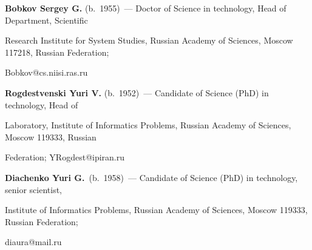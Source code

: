 \noindent

\textbf{Bobkov Sergey G.} (b.\ 1955)~--- Doctor of Science in technology, Head of Department, Scientific

Research Institute for System Studies, Russian Academy of Sciences, Moscow 117218, Russian Federation;

Bobkov@cs.niisi.ras.ru



\vspace*{2pt}



\noindent

\textbf{Rogdestvenski Yuri V.} (b.\ 1952)~--- Candidate of Science (PhD) in technology, Head of

Laboratory, Institute of Informatics Problems, Russian Academy of Sciences, Moscow 119333, Russian

Federation; YRogdest@ipiran.ru





\vspace*{2pt}



\noindent

\textbf{Diachenko Yuri G.}\ (b.\ 1958)~--- Candidate of Science (PhD) in technology, senior scientist,

Institute of Informatics Problems, Russian Academy of Sciences, Moscow 119333, Russian Federation;

diaura@mail.ru





\label{end\stat}



\renewcommand{\bibname}{\protect\rm Литература}